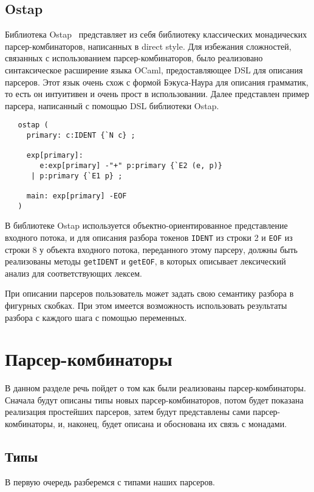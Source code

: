 \documentclass[conference]{IEEEtran}
\begin{document}
\subsection{Ostap}

Библиотека Ostap~\cite{ostap} представляет из себя библиотеку классических монадических парсер-комбинаторов, написанных в direct style. Для избежания сложностей, связанных с
использованием парсер-комбинаторов, было реализовано синтаксическое расширение языка OCaml, предоставляющее DSL для описания парсеров. Этот язык очень схож с формой Бэкуса-Наура
для описания грамматик, то есть он интуитивен и очень прост в использовании. Далее представлен пример парсера, написанный с помощью DSL библиотеки Ostap.

\begin{lstlisting}
   ostap (
     primary: c:IDENT {`N c} ;

     exp[primary]:
        e:exp[primary] -"+" p:primary {`E2 (e, p)}
      | p:primary {`E1 p} ;

     main: exp[primary] -EOF
   )
  \end{lstlisting}

В библиотеке Ostap используется объектно-ориентированное представление входного потока, и для описания разбора токенов \lstinline|IDENT| из строки 2 и \lstinline|EOF| из строки 8 у
объекта входного потока, переданного этому парсеру, должны быть реализованы методы \lstinline|getIDENT| и \lstinline|getEOF|, в которых описывает лексический анализ для соответствующих лексем.

При описании парсеров пользователь может задать свою семантику разбора в фигурных скобках. При этом имеется возможность использовать результаты разбора с каждого шага с помощью переменных.

\section{Парсер-комбинаторы}

В данном разделе речь пойдет о том как были реализованы парсер-комбинаторы. Сначала будут описаны типы новых парсер-комбинаторов, потом будет показана реализация простейших парсеров,
затем будут представлены сами парсер-комбинаторы, и, наконец, будет описана и обоснована их связь с монадами.

\subsection{Типы}
В первую очередь разберемся с типами наших парсеров.
\end{document}
